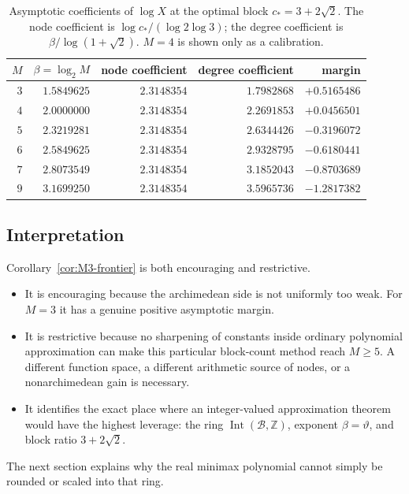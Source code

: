 \documentclass[11pt,oneside]{article}
\theoremstyle{definition}
\theoremstyle{remark}
\newcommand{\Z}{\mathbb Z}
\newcommand{\Bsem}{\mathcal B}
\newcommand{\Int}{\operatorname{Int}}
\newcommand{\thetaq}{\vartheta}
\begin{document}
\begin{table}[ht]
\centering
\small
\begin{tabular}{rrrrr}
\toprule
$M$ & $\beta=\log_2M$ & node coefficient & degree coefficient & margin \\
\midrule
$3$ & $1.5849625$ & $2.3148354$ & $1.7982868$ & $+0.5165486$ \\
$4$ & $2.0000000$ & $2.3148354$ & $2.2691853$ & $+0.0456501$ \\
$5$ & $2.3219281$ & $2.3148354$ & $2.6344426$ & $-0.3196072$ \\
$6$ & $2.5849625$ & $2.3148354$ & $2.9328795$ & $-0.6180441$ \\
$7$ & $2.8073549$ & $2.3148354$ & $3.1852043$ & $-0.8703689$ \\
$9$ & $3.1699250$ & $2.3148354$ & $3.5965736$ & $-1.2817382$ \\
\bottomrule
\end{tabular}
\caption{Asymptotic coefficients of $\log X$ at the optimal block $c_*=3+2\sqrt2$.
The node coefficient is $\log c_*/(\log2\log3)$; the degree coefficient is
$\beta/\log(1+\sqrt2)$.  $M=4$ is shown only as a calibration.}
\label{tab:efficiency}
\end{table}

\subsection{Interpretation}

Corollary~\ref{cor:M3-frontier} is both encouraging and restrictive.

\begin{itemize}
\item It is encouraging because the archimedean side is not uniformly too weak.  For $M=3$
      it has a genuine positive asymptotic margin.
\item It is restrictive because no sharpening of constants inside ordinary polynomial
      approximation can make this particular block-count method reach $M\ge5$.  A different
      function space, a different arithmetic source of nodes, or a nonarchimedean gain is
      necessary.
\item It identifies the exact place where an integer-valued approximation theorem would have
      the highest leverage: the ring $\Int(\Bsem,\Z)$, exponent
      $\beta=\thetaq$, and block ratio $3+2\sqrt2$.
\end{itemize}

The next section explains why the real minimax polynomial cannot simply be rounded or scaled
into that ring.
\end{document}

